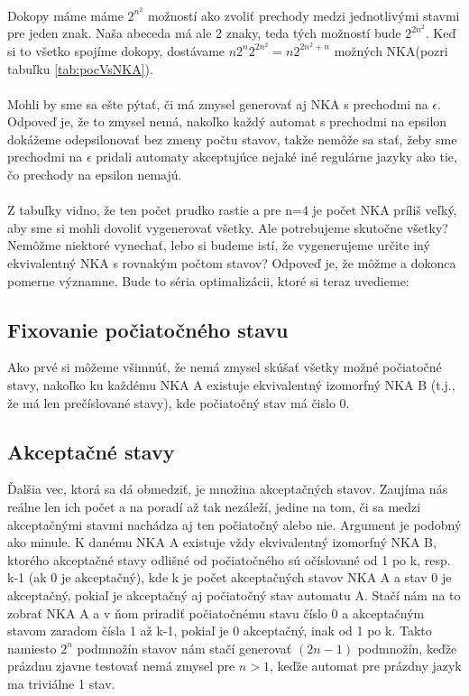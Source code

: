 \paragraph{}


Dokopy máme máme $2^{n^2}$ možností ako zvoliť prechody medzi jednotlivými stavmi pre jeden znak. Naša abeceda má ale 2 znaky, teda tých možností bude $2^{2n^2}$. Keď si to všetko spojíme dokopy, dostávame $n2^n2^{2n^2} = n2^{2n^2 + n}$ možných NKA(pozri tabuľku \ref{tab:pocVsNKA}).

\paragraph{}
Mohli by sme sa ešte pýtať, či má zmysel generovať aj NKA s prechodmi na $\epsilon$. Odpoveď je, že to zmysel nemá, nakoľko každý automat s prechodmi na epsilon dokážeme odepsilonovať bez zmeny počtu stavov, takže nemôže sa stať, žeby sme prechodmi na $\epsilon$ pridali automaty akceptujúce nejaké iné regulárne jazyky ako tie, čo prechody na epsilon nemajú.

\paragraph{}
Z tabuľky vidno, že ten počet prudko rastie a pre n=4 je počet NKA príliš veľký, aby sme si mohli dovoliť vygenerovať všetky. Ale potrebujeme skutočne všetky? Nemôžme niektoré vynechať, lebo si budeme istí, že vygenerujeme určite iný ekvivalentný NKA s rovnakým počtom stavov? Odpoveď je, že môžme a dokonca pomerne významne. Bude to séria optimalizácii, ktoré si teraz uvedieme:

\subsection{Fixovanie počiatočného stavu} Ako prvé si môžeme všimnúť, že nemá zmysel skúšať všetky možné počiatočné stavy, nakoľko ku každému NKA A existuje ekvivalentný izomorfný NKA B (t.j., že má len prečíslované stavy), kde počiatočný stav má čislo 0.

\subsection {Akceptačné stavy} Ďalšia vec, ktorá sa dá obmedziť, je množina akceptačných stavov. Zaujíma nás reálne len ich počet a na poradí až tak nezáleží, jedine na tom, či sa medzi akceptačnými stavmi nachádza aj ten počiatočný alebo nie. Argument je podobný ako minule. K danému NKA A existuje vždy ekvivalentný izomorfný NKA B, ktorého akceptačné stavy odlišné od počiatočného sú očíslované od 1 po k, resp. k-1 (ak 0 je akceptačný), kde k je počet akceptačných stavov NKA A a stav 0 je akceptačný, pokiaľ je akceptačný aj počiatočný stav automatu A. Stačí nám na to zobrať NKA A a v ňom priradiť počiatočnému stavu číslo 0 a akceptačným stavom zaradom čísla 1 až k-1, pokiaľ je 0 akceptačný, inak od 1 po k. Takto namiesto $2^n$ podmnožín stavov nám stačí generovať $(2n - 1)$ podmnožín, keďže prázdnu zjavne testovať nemá zmysel pre $n>1$, keďže automat pre prázdny jazyk ma triviálne 1 stav.


